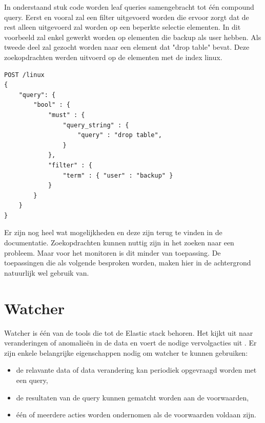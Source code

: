 In onderstaand stuk code worden leaf queries samengebracht tot één compound query. Eerst en vooral zal een filter uitgevoerd worden die ervoor zorgt dat de rest alleen uitgevoerd zal worden op een beperkte selectie elementen.
In dit voorbeeld zal enkel gewerkt worden op elementen die backup als user hebben.
Als tweede deel zal gezocht worden naar een element dat "drop table" bevat. 
Deze zoekopdrachten werden uitvoerd op de elementen met de index linux.


\lstset{escapechar=@,style=customc}  
\begin{lstlisting}[frame=single]  
POST /linux
{
    "query": {
        "bool" : {
            "must" : {
                "query_string" : {
                    "query" : "drop table",
                }
            },
            "filter" : {
                "term" : { "user" : "backup" }
            }
        }
    }
}
\end{lstlisting}

Er zijn nog heel wat mogelijkheden en deze zijn terug te vinden in de documentatie. 
Zoekopdrachten kunnen nuttig zijn in het zoeken naar een probleem. Maar voor het monitoren is dit minder van toepassing.
De toepassingen die als volgende besproken worden, maken hier in de achtergrond natuurlijk wel gebruik van.

\section{Watcher}
\label{sec:watcher}

Watcher is één van de tools die tot de Elastic stack behoren. Het kijkt uit naar veranderingen of anomalieën in de data en voert de nodige vervolgacties uit \autocite{watherdynamic}. Er zijn enkele belangrijke eigenschappen nodig om watcher te kunnen gebruiken:
\begin{itemize}
	\item de relavante data of data verandering kan periodiek opgevraagd worden met een query,
   
   \item de resultaten van de query kunnen gematcht worden aan de voorwaarden,

	\item één of meerdere acties worden ondernomen als de voorwaarden voldaan zijn.
\end{itemize}

